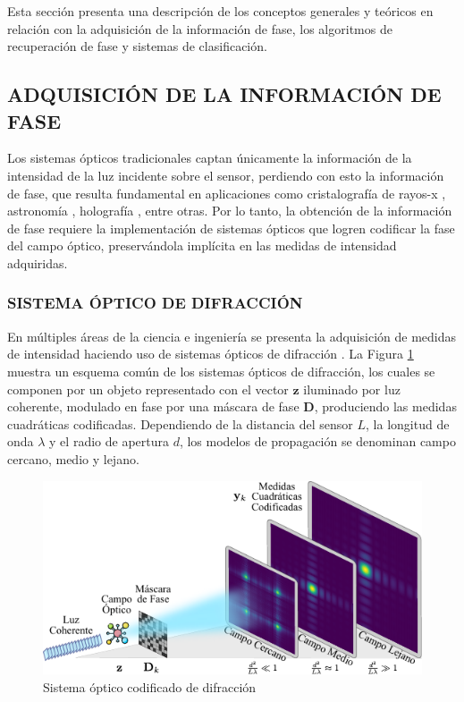 Esta sección presenta una descripción de los conceptos generales y teóricos en relación con la adquisición de la información de fase, los algoritmos de recuperación de fase y sistemas de clasificación.

\subsection{ADQUISICIÓN DE LA INFORMACIÓN DE FASE}

Los sistemas ópticos tradicionales captan únicamente la información de la intensidad de la luz incidente sobre el sensor, perdiendo con esto la información de fase, que resulta fundamental en aplicaciones como cristalografía de rayos-x \cite{pinilla2018coded}, astronomía \cite{fienup1987phase}, holografía \cite{rivenson2018phase}, entre otras. Por lo tanto, la obtención de la información de fase  requiere la implementación  de sistemas ópticos que logren codificar la fase del campo óptico, preservándola implícita en las medidas de intensidad adquiridas. 
    
\subsubsection{SISTEMA ÓPTICO DE DIFRACCIÓN}
En múltiples áreas de la ciencia e ingeniería se presenta la adquisición de medidas de intensidad haciendo uso de sistemas ópticos de difracción \cite{fienup1987phase,pinilla2018coded,rivenson2018phase}. La Figura \ref{fig:difraction_systems} muestra un esquema común de los sistemas ópticos de difracción, los cuales se componen por un objeto representado con el vector $\mathbf{z}$ iluminado por luz coherente, modulado en fase por una máscara de fase $\mathbf{D}$, produciendo las medidas cuadráticas codificadas. Dependiendo de la distancia del sensor $L$, la longitud de onda $\lambda$ y el radio de apertura $d$, los modelos de propagación se denominan campo cercano, medio y lejano.

\begin{figure}[H]
    \centering
    \includegraphics[width=\linewidth]{images/DiffractionSystem.pdf}
    \caption{\hspace{2mm}Sistema óptico codificado de difracción}
    \label{fig:difraction_systems}
\end{figure}

